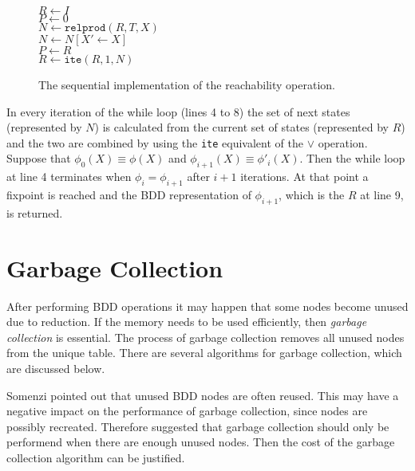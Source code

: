 \begin{figure}
	\centering
	\begin{algorithm}[H]
		\SetStartEndCondition{ }{}{}%
		\AlgoDontDisplayBlockMarkers\SetAlgoNoEnd\SetAlgoNoLine%

		 {
			$R \gets I$ \\
			$P \gets 0$ \\
			 {
				$N \gets \texttt{relprod}(R, T, X)$ \\
				$N \gets N[X' \gets X]$ \\
				$P \gets R$ \\
				$R \gets \texttt{ite}(R, 1, N)$
			}
		}
	\end{algorithm}

	\caption{The sequential implementation of the reachability operation.}
	\label{fig:reach_seq}
\end{figure}

In every iteration of the while loop (lines 4 to 8) the set of next states (represented by $N$) is calculated from the current set of states (represented by $R$) and the two are combined by using the \texttt{ite} equivalent of the $\vee$ operation. Suppose that $\phi_0(X) \equiv \phi(X)$ and $\phi_{i+1}(X) \equiv \phi'_i(X)$. Then the while loop at line 4 terminates when $\phi_{i} = \phi_{i+1}$ after $i+1$ iterations. At that point a fixpoint is reached and the BDD representation of $\phi_{i+1}$, which is the $R$ at line 9, is returned.

\section{Garbage Collection}
After performing BDD operations it may happen that some nodes become unused due to reduction. If the memory needs to be used efficiently, then \emph{garbage collection} is essential. The process of garbage collection removes all unused nodes from the unique table. There are several algorithms for garbage collection, which are discussed below. 

Somenzi \cite{somenzi2001efficient} pointed out that unused BDD nodes are often reused. This may have a negative impact on the performance of garbage collection, since nodes are possibly recreated. Therefore \cite{somenzi2001efficient} suggested that garbage collection should only be performend when there are enough unused nodes. Then the cost of the garbage collection algorithm can be justified.

